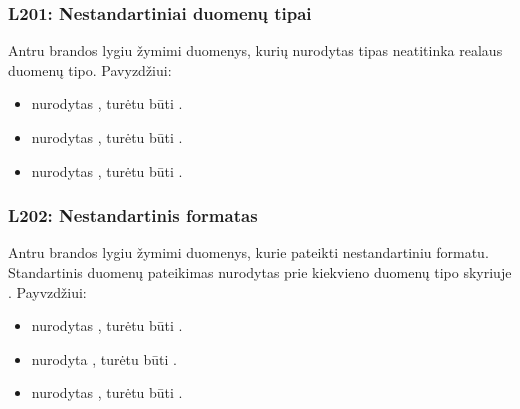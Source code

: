 \documentclass[letterpaper,10pt,lithuanian]{sphinxmanual}
\begin{document}
\subsubsection{L201: Nestandartiniai duomenų tipai}
\label{\detokenize{branda:l201-nestandartiniai-duomenu-tipai}}\label{\detokenize{branda:l201}}
\sphinxAtStartPar
Antru brandos lygiu žymimi duomenys, kurių nurodytas tipas neatitinka realaus
duomenų tipo. Pavyzdžiui:
\begin{itemize}
\item {} 
\sphinxAtStartPar
{} \sphinxhyphen{} nurodytas , turėtu būti .

\item {} 
\sphinxAtStartPar
{} \sphinxhyphen{} nurodytas , turėtu būti .

\item {} 
\sphinxAtStartPar
{} \sphinxhyphen{} nurodytas , turėtu būti .

\end{itemize}


\subsubsection{L202: Nestandartinis formatas}
\label{\detokenize{branda:l202-nestandartinis-formatas}}\label{\detokenize{branda:l202}}
\sphinxAtStartPar
Antru brandos lygiu žymimi duomenys, kurie pateikti nestandartiniu formatu.
Standartinis duomenų pateikimas nurodytas prie kiekvieno duomenų tipo skyriuje
{\hyperref[\detokenize{tipai:duomenu-tipai}]{}}. Payvzdžiui:
\begin{itemize}
\item {} 
\sphinxAtStartPar
{} \sphinxhyphen{} nurodytas , turėtu būti .

\item {} 
\sphinxAtStartPar
{} \sphinxhyphen{} nurodyta , turėtu būti .

\item {} 
\sphinxAtStartPar
{} \sphinxhyphen{} nurodytas , turėtu būti .

\end{itemize}
\end{document}
